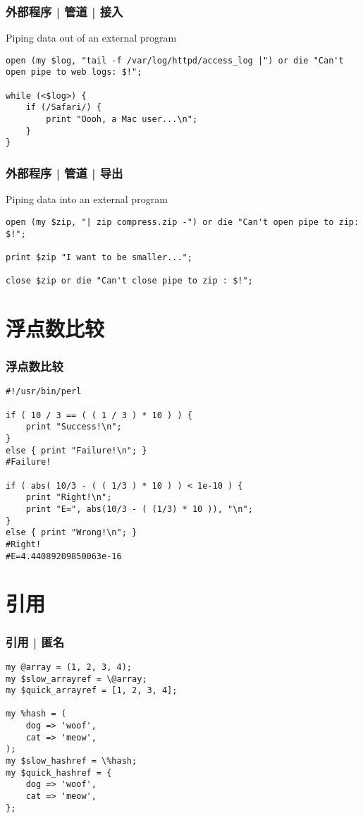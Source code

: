 \begin{frame}[fragile]
  \frametitle{外部程序 | 管道 | 接入}
  \begin{block}{Piping data out of an external program}
  \vspace{-0.5em}
\begin{lstlisting}
open (my $log, "tail -f /var/log/httpd/access_log |") or die "Can't open pipe to web logs: $!";

while (<$log>) {
    if (/Safari/) {
        print "Oooh, a Mac user...\n";
    }
}
\end{lstlisting}
  \end{block}
\end{frame}

\begin{frame}[fragile]
  \frametitle{外部程序 | 管道 | 导出}
  \begin{block}{Piping data into an external program}
  \vspace{-0.5em}
\begin{lstlisting}
open (my $zip, "| zip compress.zip -") or die "Can't open pipe to zip: $!";

print $zip "I want to be smaller...";

close $zip or die "Can't close pipe to zip : $!";
\end{lstlisting}
  \end{block}
\end{frame}

\section{浮点数比较}
\begin{frame}[fragile]
  \frametitle{浮点数比较}
  \vspace{-1.5em}
\begin{lstlisting}[basicstyle=\small\tt]
#!/usr/bin/perl

if ( 10 / 3 == ( ( 1 / 3 ) * 10 ) ) {
    print "Success!\n";
}
else { print "Failure!\n"; }
#Failure!

if ( abs( 10/3 - ( ( 1/3 ) * 10 ) ) < 1e-10 ) {
    print "Right!\n";
    print "E=", abs(10/3 - ( (1/3) * 10 )), "\n";
}
else { print "Wrong!\n"; }
#Right!
#E=4.44089209850063e-16
\end{lstlisting}
\end{frame}

\section{引用}
\begin{frame}[fragile]
  \frametitle{引用 | 匿名}
  \vspace{-1.5em}
\begin{lstlisting}
my @array = (1, 2, 3, 4);
my $slow_arrayref = \@array;
my $quick_arrayref = [1, 2, 3, 4];

my %hash = (
    dog => 'woof',
    cat => 'meow',
);
my $slow_hashref = \%hash;
my $quick_hashref = {
    dog => 'woof',
    cat => 'meow',
};
\end{lstlisting}
\end{frame}

